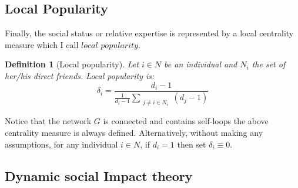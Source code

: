 \documentclass{article}
\newtheorem{definition}{Definition}
\begin{document}
\subsection{Local Popularity}
Finally, the social status or relative expertise is represented by a local centrality measure which I call $local$ $popularity$. 

\begin{definition}[Local popularity] Let $i \in N$ be an individual and $N_i$ the set of her/his direct friends. Local popularity is: 
\begin{equation}
\delta_i = \frac{d_i -1}{\frac{1}{d_i -1 }\sum_{\substack{j \neq i \in N_i}} (d_j-1) }
\end{equation}
\label{localpopularity}
\end{definition}

\noindent Notice that the network $G$ is connected and contains self-loops the above centrality measure is always defined. Alternatively, without making any assumptions, for any individual $i \in N$,  if $d_i=1$ then set $\delta_i \equiv 0$. %

\subsection{Dynamic social Impact theory}
\end{document}
